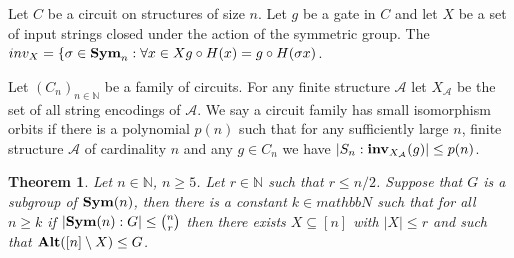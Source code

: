 \documentclass[12pt]{report}
\newtheorem{thm}{Theorem} \newtheorem{claim}{Claim}
\newcommand{\inv}{\text{\textbf{inv}}}
\newcommand{\alt}{\text{\textbf{Alt}}}
\newcommand{\sym}{\text{\textbf{Sym}}}
\begin{document}
\begin{definition}
Let $C$ be a circuit on structures of size $n$. Let $g$ be a gate in $C$ and let $X$ be a set of input strings closed under the action of the symmetric group. The $inv_X = \{ \sigma \in \sym_n : \forall x \in X g \circ H (x) = g \circ H (\sigma x)$.
\end{definition}
\begin{definition}
  Let $(C_n)_{n \in \mathbb{N}}$ be a family of circuits. For any
  finite structure $\mathcal{A}$ let $X_{\mathcal{A}}$ be the set of
  all string encodings of $\mathcal{A}$. We say a circuit family has
  small isomorphism orbits if there is a polynomial $p(n)$ such that
  for any sufficiently large $n$, finite structure $\mathcal{A}$ of
  cardinality $n$ and any $g \in C_n$ we have
  $\vert S_n : \inv_{X_{\mathcal{A}}}(g) \vert \leq p(n)$.
\end{definition}

\begin{thm}
  \label{thm:simple_group}
  Let $n \in \mathbb{N}$, $n \geq 5$. Let $r \in \mathbb{N}$ such that
  $r \leq n/2$. Suppose that $G$ is a subgroup of $\sym(n)$, then
  there is a constant $k \in mathbb{N}$ such that for all $n \geq k$
  if $\vert \sym(n):G \vert \leq {{n}\choose {r}}$ then there exists
  $X \subseteq [n]$ with $\vert X \vert \leq r$ and such that
  $\alt([n] \setminus X) \leq G$.
\end{thm}
\end{document}
